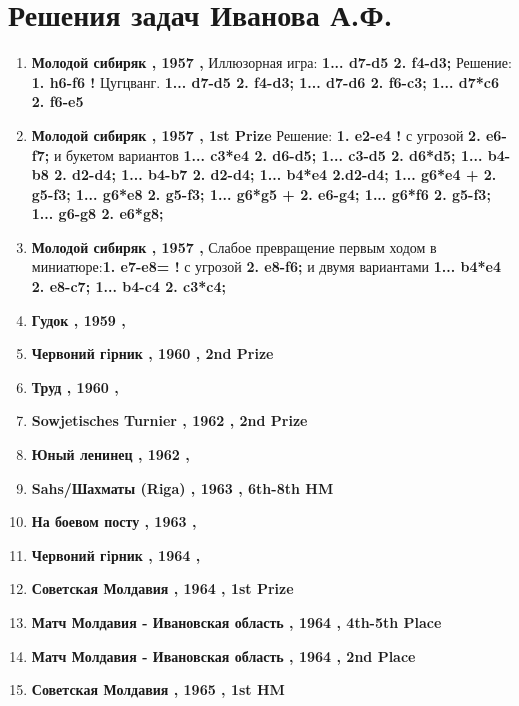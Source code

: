 \section{Решения задач Иванова А.Ф.}

\begin{enumerate}
\item  \textbf{ Молодой сибиряк , 1957 , } Иллюзорная игра: \textbf{1... d7-d5 2. \knight{}f4-d3\mate{};} Решение: \textbf{1. \queen{}h6-f6 !} Цугцванг. \textbf{1... d7-d5 2. \knight{}f4-d3\mate{}; 1... d7-d6 2. \queen{}f6-c3\mate{}; 1... d7*c6 2. \queen{}f6-e5\mate{}}
\item  \textbf{ Молодой сибиряк , 1957 , 1st Prize } Решение: \textbf{1. e2-e4 !} с угрозой \textbf{2. \bishop{}e6-f7\mate{};} и букетом вариантов \textbf{1... \knight{}c3*e4 2. \rook{}d6-d5\mate{}; 1... \knight{}c3-d5 2. \rook{}d6*d5\mate{}; 1... \rook{}b4-b8 2. d2-d4\mate{}; 1... \rook{}b4-b7 2. d2-d4\mate{}; 1... \rook{}b4*e4 2.d2-d4\mate{}; 1... \queen{}g6*e4 + 2. \knight{}g5-f3\mate{}; 1... \queen{}g6*e8 2. \knight{}g5-f3\mate{}; 1... \queen{}g6*g5 + 2. \bishop{}e6-g4\mate{}; 1... \queen{}g6*f6 2. \knight{}g5-f3\mate{}; 1... \queen{}g6-g8 2. \bishop{}e6*g8\mate{};}
\item  \textbf{ Молодой сибиряк , 1957 , } Слабое превращение первым ходом в миниатюре:\textbf{1. e7-e8=\knight{} !} с угрозой \textbf{2. \knight{}e8-f6\mate{};} и двумя вариантами \textbf{1... \rook{}b4*e4 2. \knight{}e8-c7\mate{}; 1... \rook{}b4-c4 2. \queen{}c3*c4\mate{};}
\item  \textbf{ Гудок , 1959 , }
\item  \textbf{ Червоний гiрник , 1960 , 2nd Prize }
\item  \textbf{ Труд , 1960 , }
\item  \textbf{ Sowjetisches Turnier , 1962 , 2nd Prize }
\item  \textbf{ Юный ленинец , 1962 , }
\item  \textbf{ Sahs/Шахматы (Riga) , 1963 , 6th-8th HM }
\item  \textbf{ На боевом посту , 1963 , }
\item  \textbf{ Червоний гiрник , 1964 , }
\item  \textbf{ Советская Молдавия , 1964 , 1st Prize }
\item  \textbf{ Матч Молдавия - Ивановская область , 1964 , 4th-5th Place }
\item  \textbf{ Матч Молдавия - Ивановская область , 1964 , 2nd Place }
\item  \textbf{ Советская Молдавия , 1965 , 1st HM }

\end{enumerate}
